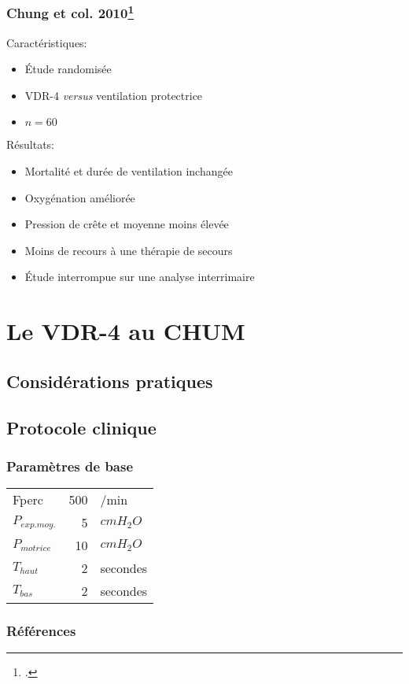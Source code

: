 \documentclass{beamer}
\begin{document}
\begin{frame}
	\frametitle{Chung et col. 2010\footcite{Chung2010}}

	\begin{block}{Caractéristiques:}

	\begin{itemize}
		\item Étude randomisée
		\item VDR-4 \textit{versus} ventilation protectrice
		\item $n=60$
	\end{itemize}
	\end{block}

	\begin{block}{Résultats:}

	\begin{itemize}
		\item Mortalité et durée de ventilation inchangée
		\item Oxygénation améliorée
		\item Pression de crête et moyenne moins élevée
		\item Moins de recours à une thérapie de secours
		\item Étude interrompue sur une analyse interrimaire
	\end{itemize}
	\end{block}

\end{frame}
\section{Le VDR-4 au CHUM}

\subsection{Considérations pratiques}
\subsection{Protocole clinique}

\begin{frame}
	\frametitle{Paramètres de base}
	\begin{tabular}{l r l}
		Fperc&500&/min\\ 
		$P_{exp. moy.}$	&5	&$cmH_2O$\\
		$P_{motrice}$		&10	&$cmH_2O$\\
		$T_{haut}$			& 2	&secondes\\
		$T_{bas}$				& 2	&secondes
	\end{tabular}
\end{frame}

\begin{frame}
\frametitle{Références}
	\printbibliography{}
\end{frame}
\end{document}
